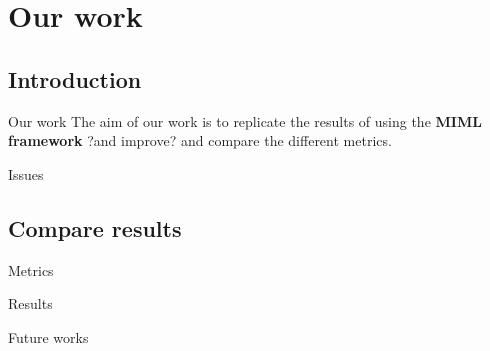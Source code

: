 \section{Our work}

\subsection*{Introduction}
\begin{frame}{Our work}
	The aim of our work is to replicate the results of \cite{miml1} using the \textbf{MIML framework} ?and improve? and compare the different metrics.
	
\end{frame}
\begin{frame}{Issues}
	
	
\end{frame}

\subsection{Compare results}
\begin{frame}{Metrics}
	
	\begin{flushright}
		\cite{metrics}
	\end{flushright}
\end{frame}

\begin{frame}{Results}
	
\end{frame}

\begin{frame}{Future works}
	
\end{frame}